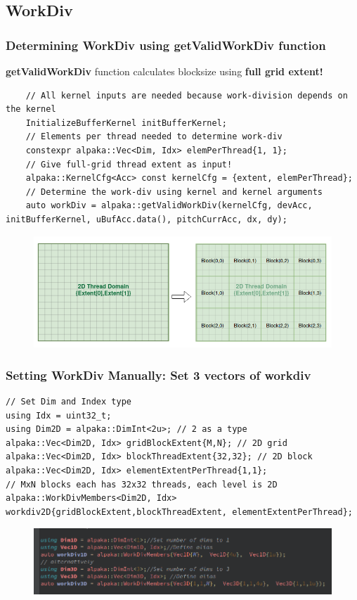 \documentclass[9pt]{beamer}
\begin{document}
\subsection{WorkDiv}
\begin{frame}[fragile]
\frametitle{Determining WorkDiv using getValidWorkDiv function}
\textbf{getValidWorkDiv} function calculates blocksize using \textbf{full grid extent!}
\lstset{basicstyle=\ttfamily\scriptsize}
\begin{lstlisting}
    // All kernel inputs are needed because work-division depends on the kernel
    InitializeBufferKernel initBufferKernel;
    // Elements per thread needed to determine work-div
    constexpr alpaka::Vec<Dim, Idx> elemPerThread{1, 1};
    // Give full-grid thread extent as input!
    alpaka::KernelCfg<Acc> const kernelCfg = {extent, elemPerThread};
    // Determine the work-div using kernel and kernel arguments
    auto workDiv = alpaka::getValidWorkDiv(kernelCfg, devAcc, initBufferKernel, uBufAcc.data(), pitchCurrAcc, dx, dy);
\end{lstlisting}
\begin{figure}
    \centering
    \includegraphics[width=0.75\linewidth]{Screenshot from 2024-10-18 15-16-26.png}
\end{figure}
\end{frame}


\begin{frame}[fragile]
\frametitle{Setting WorkDiv Manually: Set 3 vectors of workdiv}
\begin{lstlisting}
// Set Dim and Index type
using Idx = uint32_t;
using Dim2D = alpaka::DimInt<2u>; // 2 as a type
alpaka::Vec<Dim2D, Idx> gridBlockExtent{M,N}; // 2D grid
alpaka::Vec<Dim2D, Idx> blockThreadExtent{32,32}; // 2D block
alpaka::Vec<Dim2D, Idx> elementExtentPerThread{1,1};
// MxN blocks each has 32x32 threads, each level is 2D
alpaka::WorkDivMembers<Dim2D, Idx> workdiv2D{gridBlockExtent,blockThreadExtent, elementExtentPerThread};
\end{lstlisting}
\begin{figure}
    \centering
    \includegraphics[width=0.75\linewidth]{workdivManual.png}
\end{figure}

\end{frame}
\end{document}
